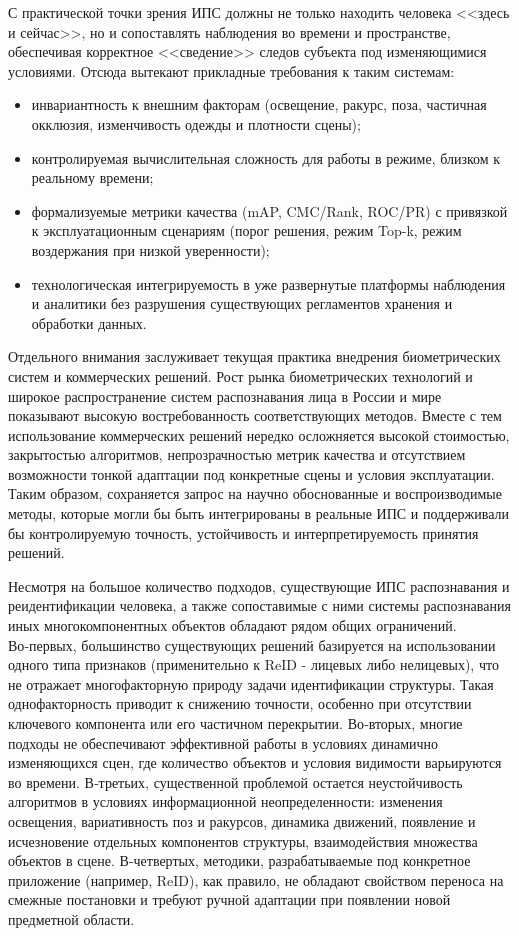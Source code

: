 С практической точки зрения ИПС должны не только находить человека <<здесь и
сейчас>>, но и сопоставлять наблюдения во времени и пространстве, обеспечивая
корректное <<сведение>> следов субъекта под изменяющимися условиями. Отсюда
вытекают прикладные требования к таким системам:
\begin{itemize}
    \item инвариантность к внешним факторам (освещение, ракурс, поза, частичная
    окклюзия, изменчивость одежды и плотности сцены);
    \item контролируемая вычислительная сложность для работы в режиме, близком
    к реальному времени;
    \item формализуемые метрики качества (mAP, CMC/Rank, ROC/PR) с привязкой
    к эксплуатационным сценариям (порог решения, режим Top-k, режим воздержания
    при низкой уверенности);
    \item технологическая интегрируемость в уже развернутые платформы наблюдения
    и аналитики без разрушения существующих регламентов хранения и обработки данных.
\end{itemize}

Отдельного внимания заслуживает текущая практика внедрения биометрических
систем и коммерческих решений. Рост рынка биометрических технологий и широкое
распространение систем распознавания лица в России и мире~\cite{Nazarova2023biometry,Mubinova2024face,Emets2019biometry}
показывают высокую востребованность соответствующих методов. Вместе с тем
использование коммерческих решений нередко осложняется высокой стоимостью,
закрытостью алгоритмов, непрозрачностью метрик качества и отсутствием
возможности тонкой адаптации под конкретные сцены и условия эксплуатации.
Таким образом, сохраняется запрос на научно обоснованные и воспроизводимые
методы, которые могли бы быть интегрированы в реальные ИПС и поддерживали бы
контролируемую точность, устойчивость и интерпретируемость принятия решений.

Несмотря на большое количество подходов, существующие ИПС распознавания и
реидентификации человека, а также сопоставимые с ними системы распознавания
иных многокомпонентных объектов обладают рядом общих ограничений.
Во‑первых, большинство существующих решений базируется на использовании
одного типа признаков (применительно к ReID - лицевых либо нелицевых),
что не отражает многофакторную природу задачи идентификации структуры.
Такая однофакторность приводит к снижению точности, особенно при отсутствии
ключевого компонента или его частичном перекрытии. Во‑вторых, многие
подходы не обеспечивают эффективной работы в условиях динамично
изменяющихся сцен, где количество объектов и условия видимости варьируются
во времени. В‑третьих, существенной проблемой остается неустойчивость
алгоритмов в условиях информационной неопределенности: изменения освещения,
вариативность поз и ракурсов, динамика движений, появление и исчезновение
отдельных компонентов структуры, взаимодействия множества объектов
в сцене. В‑четвертых, методики, разрабатываемые под конкретное приложение
(например, ReID), как правило, не обладают свойством переноса на смежные
постановки и требуют ручной адаптации при появлении новой предметной
области.

